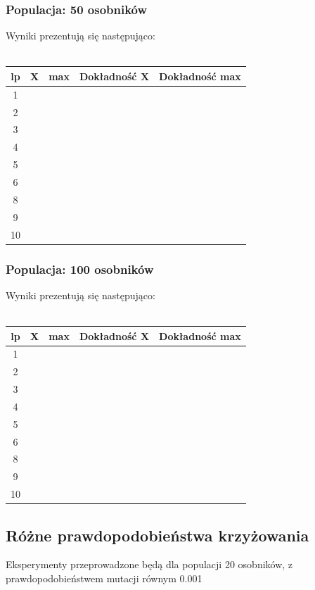 \documentclass[a4paper,11pt]{article}
\begin{document}
			\subsubsection{Populacja: 50 osobników}
				Wyniki prezentują się następująco:\\~\\
				\begin{tabular}{|c|c|c|c|c|}
					\hline 
					lp & X & max & Dokładność X & Dokładność max\\
					\hline
					1 &  &  &  & \\
					\hline
					2 &  &  &  & \\
					\hline
					3 &  &  &  & \\
					\hline
					4 &  &  &  & \\
					\hline
					5 &  &  &  & \\
					\hline
					6 &  &  &  & \\
					\hline
					8 &  &  &  & \\
					\hline
					9 &  &  &  & \\
					\hline
					10 &  &  &  & \\
					\hline
				\end{tabular} 
			\subsubsection{Populacja: 100 osobników}
				Wyniki prezentują się następująco:\\~\\
				\begin{tabular}{|c|c|c|c|c|}
					\hline 
					lp & X & max & Dokładność X & Dokładność max\\
					\hline
					1 &  &  &  & \\
					\hline
					2 &  &  &  & \\
					\hline
					3 &  &  &  & \\
					\hline
					4 &  &  &  & \\
					\hline
					5 &  &  &  & \\
					\hline
					6 &  &  &  & \\
					\hline
					8 &  &  &  & \\
					\hline
					9 &  &  &  & \\
					\hline
					10 &  &  &  & \\
					\hline
				\end{tabular} 
			\subsection{Różne prawdopodobieństwa krzyżowania}
				Eksperymenty przeprowadzone będą dla populacji 20 osobników, z prawdopodobieństwem mutacji równym 0.001
\end{document}
